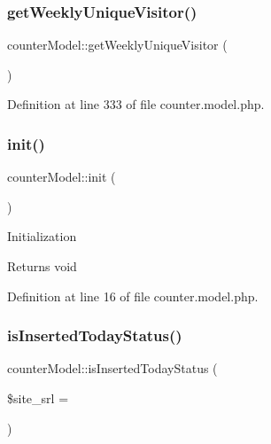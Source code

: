\hypertarget{classcounterModel_ad43ae0f93cd42e9a59262abfe296fb9a}{}\label{classcounterModel_ad43ae0f93cd42e9a59262abfe296fb9a} 
\subsubsection{\texorpdfstring{get\+Weekly\+Unique\+Visitor()}{getWeeklyUniqueVisitor()}}
{\footnotesize\ttfamily counter\+Model\+::get\+Weekly\+Unique\+Visitor (\begin{DoxyParamCaption}{ }\end{DoxyParamCaption})}



Definition at line 333 of file counter.\+model.\+php.

\hypertarget{classcounterModel_a3131ee0122d97e0b7d39d6d31a7227dc}{}\label{classcounterModel_a3131ee0122d97e0b7d39d6d31a7227dc} 
\subsubsection{\texorpdfstring{init()}{init()}}
{\footnotesize\ttfamily counter\+Model\+::init (\begin{DoxyParamCaption}{ }\end{DoxyParamCaption})}

Initialization

\begin{DoxyReturn}{Returns}
void 
\end{DoxyReturn}


Definition at line 16 of file counter.\+model.\+php.

\hypertarget{classcounterModel_ad2e64d22eb37f58e91a37ebb1f421d35}{}\label{classcounterModel_ad2e64d22eb37f58e91a37ebb1f421d35} 
\subsubsection{\texorpdfstring{is\+Inserted\+Today\+Status()}{isInsertedTodayStatus()}}
{\footnotesize\ttfamily counter\+Model\+::is\+Inserted\+Today\+Status (\begin{DoxyParamCaption}\item[{}]{\$site\+\_\+srl = {} }\end{DoxyParamCaption})}


